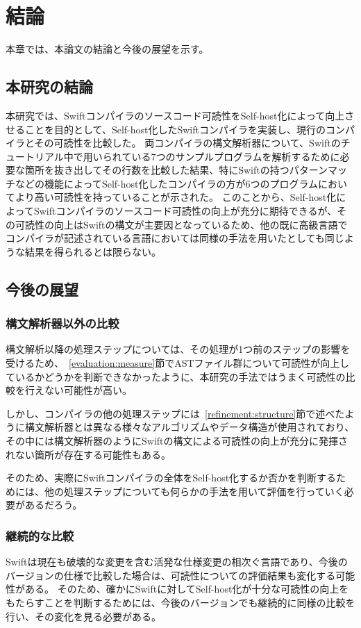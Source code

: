 \chapter{結論}
\label{conclusion}

本章では、本論文の結論と今後の展望を示す。

\section{本研究の結論}

本研究では、Swiftコンパイラのソースコード可読性をSelf-host化によって向上させることを目的として、Self-host化したSwiftコンパイラを実装し、現行のコンパイラとその可読性を比較した。
両コンパイラの構文解析器について、Swiftのチュートリアル中で用いられている7つのサンプルプログラムを解析するために必要な箇所を抜き出してその行数を比較した結果、特にSwiftの持つパターンマッチなどの機能によってSelf-host化したコンパイラの方が6つのプログラムにおいてより高い可読性を持っていることが示された。
このことから、Self-host化によってSwiftコンパイラのソースコード可読性の向上が充分に期待できるが、その可読性の向上はSwiftの構文が主要因となっているため、他の既に高級言語でコンパイラが記述されている言語においては同様の手法を用いたとしても同じような結果を得られるとは限らない。

\section{今後の展望}

\subsection{構文解析器以外の比較}

構文解析以降の処理ステップについては、その処理が1つ前のステップの影響を受けるため、~\ref{evaluation:measure}節でASTファイル群について可読性が向上しているかどうかを判断できなかったように、本研究の手法ではうまく可読性の比較を行えない可能性が高い。

しかし、コンパイラの他の処理ステップには~\ref{refinement:structure}節で述べたように構文解析器とは異なる様々なアルゴリズムやデータ構造が使用されており、その中には構文解析器のようにSwiftの構文による可読性の向上が充分に発揮されない箇所が存在する可能性もある。

そのため、実際にSwiftコンパイラの全体をSelf-host化するか否かを判断するためには、他の処理ステップについても何らかの手法を用いて評価を行っていく必要があるだろう。

\subsection{継続的な比較}

Swiftは現在も破壊的な変更を含む活発な仕様変更の相次ぐ言語であり、今後のバージョンの仕様で比較した場合は、可読性についての評価結果も変化する可能性がある。
そのため、確かにSwiftに対してSelf-host化が十分な可読性の向上をもたらすことを判断するためには、今後のバージョンでも継続的に同様の比較を行い、その変化を見る必要がある。

